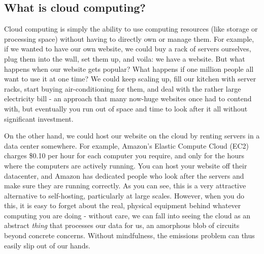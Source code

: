 \documentclass{article}
\begin{document}
\subsection{What is cloud computing?}
Cloud computing is simply the ability to use computing resources (like storage or processing space) without having to directly own or manage them. For example, if we wanted to have our own website, we could buy a rack of servers ourselves, plug them into the wall, set them up, and voila: we have a website. But what happens when our website gets popular? What happens if one million people all want to use it at one time? We could keep scaling up, fill our kitchen with server racks, start buying air-conditioning for them, and deal with the rather large electricity bill - an approach that many now-huge websites once had to contend with, but eventually you run out of space and time to look after it all without significant investment. \newline

On the other hand, we could host our website on the cloud by renting servers in a data center somewhere. For example, Amazon's Elastic Compute Cloud (EC2) charges \$0.10 per hour for each computer you require, and only for the hours where the computers are actively running. You can host your website off their datacenter, and Amazon has dedicated people who look after the servers and make sure they are running correctly. As you can see, this is a very attractive alternative to self-hosting, particularly at large scales. However, when you do this, it is easy to forget about the real, physical equipment behind whatever computing you are doing - without care, we can fall into seeing the cloud as an abstract \emph{thing} that processes our data for us, an amorphous blob of circuits beyond concrete concerns. Without mindfulness, the emissions problem can thus easily slip out of our hands. 
\end{document}

